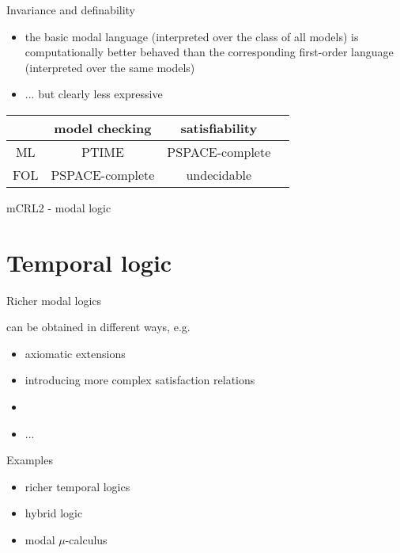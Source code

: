 \documentclass{beamer}
\begin{document}
\begin{slide}{Invariance and definability}\label{s:36}
\small

\begin{itemize}
\item the basic modal language (interpreted over the class of all models) is computationally better behaved than the corresponding first-order language (interpreted over the same models)
\item ... but clearly less  expressive 
\end{itemize}

\begin{center}
\begin{tabular}{|c|c|c|c|}
\hline
 & model checking & satisfiability \\ \hline
 ML & PTIME & PSPACE-complete  \\
 FOL & PSPACE-complete & undecidable \\
 \hline
\end{tabular}
\end{center}

  
  \vspace{0.2cm}
\end{slide}


\begin{slide}{mCRL2 - modal logic}
\small


\end{slide}



 \section{Temporal logic}


\begin{slide}{Richer modal logics}\label{s:40}
\small

can be obtained in different ways, e.g.

\begin{itemize}
\item axiomatic extensions
\item introducing more complex satisfaction relations
\item {}
\item ...
\end{itemize}
 
 Examples
 \begin{itemize}
 \item richer temporal logics
\item hybrid logic
 \item modal $\mu$-calculus 
\end{itemize}
\end{slide}
\end{document}
